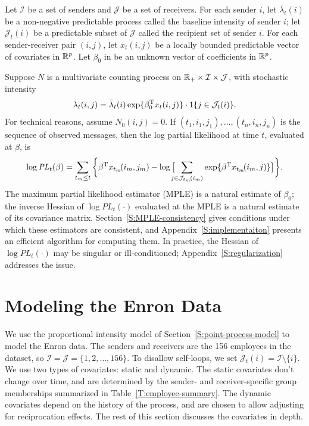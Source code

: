 \documentclass[aoas,preprint]{imsart}
\begin{document}
Let $\mathcal{I}$ be a set of senders and $\mathcal{J}$ be a set of receivers.
For each sender $i$, let $\bar \lambda_t(i)$ be a non-negative predictable
process called the baseline intensity of sender $i$; let
$\mathcal{J}_t(i)$ be a predictable subset of $\mathcal{J}$ called the 
recipient set of sender $i$.
For each sender-receiver pair $(i,j)$, let $x_t(i,j)$ be a locally bounded
predictable vector of covariates in $\mathbb{R}^p$.  Let $\beta_0$ in
be an unknown vector of coefficients in  $\mathbb{R}^p$.

Suppose $N$ is a multivariate counting process on 
$\mathbb{R}_+ \times \mathcal{I} \times \mathcal{J}$,
with stochastic intensity
\begin{equation}\label{E:cox-intensity}
    \lambda_t(i,j)
        =
        \bar \lambda_t(i)
        \exp\{ \beta_0^\trans x_t(i, j) \}
        \cdot
        1{\{j \in \mathcal{J}_t(i)\}}.
\end{equation}
For technical reasons, assume $N_0(i,j) = 0$.  If
$(t_1, i_1, j_1), \ldots, (t_n, i_n, j_n)$ is the sequence of observed
messages, then the log partial likelihood at time $t$, evaluated at $\beta$,
is
\begin{equation}\label{E:log-pl}
    \log
    \mathit{PL}_t(\beta)
        =
        \sum_{t_m \leq t}
        \bigg\{
            \beta^\trans x_{t_m}\!(i_m, j_m)
            -
            \log\big[
                \!\!\!\!
                \sum_{j \in \mathcal{J}_{t_m}\!(i_m)}
                    \exp\{ \beta^\trans x_{t_m}\!(i_m, j)\}
            \big]
        \bigg\}.
\end{equation}
The maximum partial likelihood estimator (MPLE) is a natural
estimate of $\beta_0$; the inverse Hessian of $\log \mathit{PL}_t(\cdot)$
evaluated at the MPLE is a natural estimate of its covariance matrix.
Section~\ref{S:MPLE-consistency} gives conditions under which these
estimators are consistent, and Appendix~\ref{S:implementaiton} presents
an efficient algorithm for computing them.  In practice, the
Hessian of $\log \mathit{PL}_t(\cdot)$ may be singular or ill-conditioned;
Appendix~\ref{S:regularization} addresses the issue.

\section{Modeling the Enron Data}\label{S:enron-modeling}

We use the proportional intensity model of
Section~\ref{S:point-process-model} to model the Enron data.
The senders and receivers are the 156 employees in the dataset, so
$\mathcal{I} = \mathcal{J} = \{ 1, 2, \ldots, 156 \}$.  To disallow
self-loops, we set $\mathcal{J}_t(i) = \mathcal{I} \setminus \{ i \}$.
We use two types of covariates: static and dynamic.  The static covariates
don't change over time, and are determined by the sender- and
receiver-specific group memberships summarized in
Table~\ref{T:employee-summary}.  The dynamic covariates depend on the
history of the process, and are chosen to allow adjusting for reciprocation
effects.  The rest of this section discusses the covariates in depth.
\end{document}
